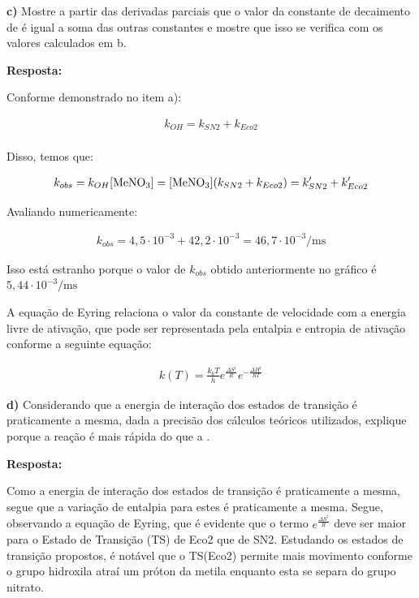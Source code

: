 \commentspace

\textbf{c)} Mostre a partir das derivadas parciais que o valor da constante de decaimento de  é igual a soma das outras constantes e mostre que isso se verifica com os valores calculados em b.

\textbf{Resposta:}

Conforme demonstrado no item a):

\begin{align*}
    k_{OH} = k_{SN2} + k_{Eco2} \\
\end{align*}

Disso, temos que:

\begin{align*}
    k_{obs} = k_{OH}[\ce{MeNO3}] = [\ce{MeNO3}] (k_{SN2} + k_{Eco2}) = k'_{SN2} + k'_{Eco2}
\end{align*}

Avaliando numericamente:

\begin{align*}
    k_{obs} = 4,5 \cdot 10^{-3} + 42,2 \cdot 10^{-3} = 46,7 \cdot 10^{-3} \si{\per \milli \second}
\end{align*}

Isso está estranho porque o valor de \(k_{obs}\) obtido anteriormente no gráfico é \(5,44 \cdot 10^{-3} \si{\per\milli\second}\)

\commentspace

A equação de Eyring relaciona o valor da constante de velocidade com a energia livre de ativação, que pode ser representada pela entalpia e entropia de ativação conforme a seguinte equação:

\begin{align*}
    k(T) = \frac{k_b T}{h} e^{\frac{\Delta S^\ddagger}{R}} e^{-\frac{\Delta H^\ddagger}{RT}}   
\end{align*}


\textbf{d)} Considerando que a energia de interação dos estados de transição é praticamente a mesma, dada a precisão dos cálculos teóricos utilizados, explique porque a reação  é mais rápida do que a .

\textbf{Resposta:}

Como a energia de interação dos estados de transição é praticamente a mesma, segue que a variação de entalpia para estes é praticamente a mesma. Segue, observando a equação de Eyring, que é evidente que o termo \(e^{\frac{\Delta S^{\ddagger}}{R}}\) deve ser maior para o Estado de Transição (TS) de Eco2 que de SN2. Estudando os estados de transição propostos, é notável que o TS(Eco2) permite mais movimento conforme o grupo hidroxila atraí um próton da metila enquanto esta se separa do grupo nitrato.


